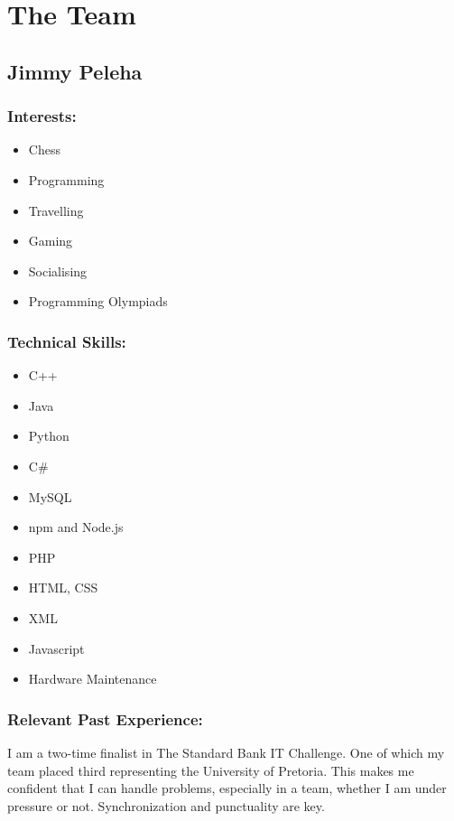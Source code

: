 \section{The Team}

\subsection{Jimmy Peleha}

\subsubsection{Interests:}
\begin{itemize}
	\item Chess
	\item Programming
	\item Travelling
	\item Gaming
	\item Socialising
	\item Programming Olympiads
\end{itemize}

\subsubsection{Technical Skills:}
\begin{itemize}
	\item C++
	\item Java
	\item Python
	\item C#
	\item MySQL
	\item npm and Node.js
	\item PHP
	\item HTML, CSS
	\item XML
	\item Javascript
	\item Hardware Maintenance 
\end{itemize}


\subsubsection{Relevant Past Experience:}
\par{I am a two-time finalist in The Standard Bank IT Challenge. One of which my team placed third representing the University of Pretoria. This makes me confident that I can handle problems, especially in a team, whether I am under pressure or not. Synchronization and punctuality are key.}

